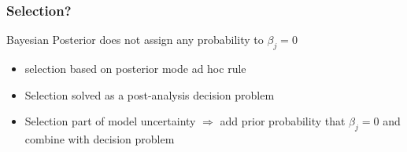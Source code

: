 \documentclass[]{beamer}
\begin{document}
\begin{frame}
  \frametitle{Selection?}
  Bayesian Posterior does not assign any probability to $\beta_j = 0$

  \begin{itemize}
  \item selection based on posterior mode ad hoc rule \pause
  \item Selection solved as a post-analysis decision problem \pause
  \item Selection part of model uncertainty $\Rightarrow$ add prior \pause
    probability that $\beta_j = 0$  and combine with decision problem 
  \end{itemize}
\end{frame}
\begin{frame}
  
\end{frame}
\begin{frame}
  
\end{frame}

\begin{frame}
  
\end{frame}
\begin{frame}
  
\end{frame}
\end{document}
